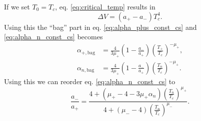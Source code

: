 If we set $T_0 = T_c$, eq. \eqref{eq:critical_temp} results in
\begin{equation}
\Delta V = (a_+ - a_-) T_c^4.
\end{equation}
Using this the ``bag'' part in eq. \eqref{eq:alpha_plus_const_cs} and \eqref{eq:alpha_n_const_cs} becomes
\begin{align}
\alpha_{+,\text{bag}} &= \frac{4}{3 \mu_+} \left( 1 - \frac{a_-}{a_+} \right) \left( \frac{T_+}{T_c} \right)^{-\mu_+}, \\
\alpha_{n,\text{bag}} &= \frac{4}{3 \mu_+} \left( 1 - \frac{a_-}{a_+} \right) \left( \frac{T_n}{T_c} \right)^{-\mu_+}.
\end{align}
Using this we can reorder eq. \eqref{eq:alpha_n_const_cs} to
\begin{equation}
\frac{a_-}{a_+} = \frac{4 + \left( \mu_+ - 4 - 3 \mu_+ \alpha_n \right) \left(\frac{T_n}{T_c}\right)^{\mu_+}}{4 + \left( \mu_- - 4 \right) \left(\frac{T_n}{T_c}\right)^{\mu_-}}.
\end{equation}
\iffalse
Noting that $T_n < T_c$, this restricts $\alpha_n$ to
\begin{equation}
\alpha_n > \frac{\mu_+ - \mu_-}{3 \mu_+}.
\end{equation}
Even though we have used $T_0 = T_c$ in the intermediate steps, this restriction is general.
\fi


